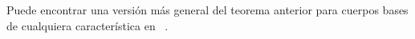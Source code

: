\begin{nota}
	Puede encontrar una versión más general del teorema anterior para cuerpos bases de cualquiera característica en ~\cite{Silverman:2009}.
\end{nota}

%


